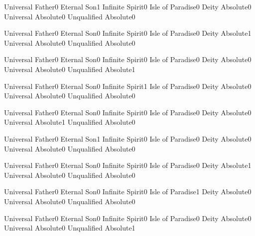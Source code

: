 {Universal Father}{0}
{Eternal Son}{1}
{Infinite Spirit}{0}
{Isle of Paradise}{0}
{Deity Absolute}{0}
{Universal Absolute}{0}
{Unqualified Absolute}{0}
\qstop

{Universal Father}{0}
{Eternal Son}{0}
{Infinite Spirit}{0}
{Isle of Paradise}{0}
{Deity Absolute}{1}
{Universal Absolute}{0}
{Unqualified Absolute}{0}
\qstop

{Universal Father}{0}
{Eternal Son}{0}
{Infinite Spirit}{0}
{Isle of Paradise}{0}
{Deity Absolute}{0}
{Universal Absolute}{0}
{Unqualified Absolute}{1}
\qstop

{Universal Father}{0}
{Eternal Son}{0}
{Infinite Spirit}{1}
{Isle of Paradise}{0}
{Deity Absolute}{0}
{Universal Absolute}{0}
{Unqualified Absolute}{0}
\qstop

{Universal Father}{0}
{Eternal Son}{0}
{Infinite Spirit}{0}
{Isle of Paradise}{0}
{Deity Absolute}{0}
{Universal Absolute}{1}
{Unqualified Absolute}{0}
\qstop

{Universal Father}{0}
{Eternal Son}{1}
{Infinite Spirit}{0}
{Isle of Paradise}{0}
{Deity Absolute}{0}
{Universal Absolute}{0}
{Unqualified Absolute}{0}
\qstop

{Universal Father}{0}
{Eternal Son}{0}
{Infinite Spirit}{0}
{Isle of Paradise}{0}
{Deity Absolute}{1}
{Universal Absolute}{0}
{Unqualified Absolute}{0}
\qstop

{Universal Father}{0}
{Eternal Son}{0}
{Infinite Spirit}{0}
{Isle of Paradise}{1}
{Deity Absolute}{0}
{Universal Absolute}{0}
{Unqualified Absolute}{0}
\qstop

{Universal Father}{0}
{Eternal Son}{0}
{Infinite Spirit}{0}
{Isle of Paradise}{0}
{Deity Absolute}{0}
{Universal Absolute}{0}
{Unqualified Absolute}{1}
\qstop

